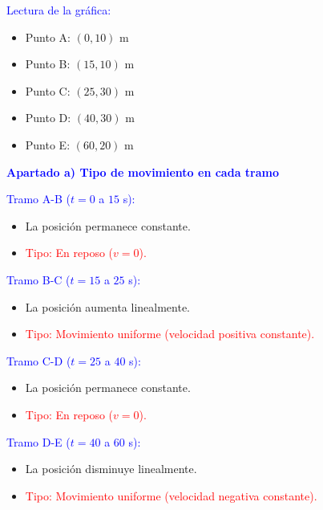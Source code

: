 \begin{exercise}
\begin{solu}
        \vspace{0.3cm}

        \textcolor{blue}{Lectura de la gráfica:}
        \begin{itemize}
            \item Punto A: $(0,10)$ m
            \item Punto B: $(15,10)$ m
            \item Punto C: $(25,30)$ m
            \item Punto D: $(40,30)$ m
            \item Punto E: $(60,20)$ m
        \end{itemize}

        \textbf{\textcolor{blue}{Apartado a) Tipo de movimiento en cada tramo}}

        \textcolor{blue}{Tramo A-B ($t=0$ a $15$ s):}
        \begin{itemize}
            \item La posición permanece constante.
            \item \textcolor{red}{Tipo: En reposo ($v=0$).}
        \end{itemize}

        \textcolor{blue}{Tramo B-C ($t=15$ a $25$ s):}
        \begin{itemize}
            \item La posición aumenta linealmente.
            \item \textcolor{red}{Tipo: Movimiento uniforme (velocidad positiva constante).}
        \end{itemize}

        \textcolor{blue}{Tramo C-D ($t=25$ a $40$ s):}
        \begin{itemize}
            \item La posición permanece constante.
            \item \textcolor{red}{Tipo: En reposo ($v=0$).}
        \end{itemize}

        \textcolor{blue}{Tramo D-E ($t=40$ a $60$ s):}
        \begin{itemize}
            \item La posición disminuye linealmente.
            \item \textcolor{red}{Tipo: Movimiento uniforme (velocidad negativa constante).}
        \end{itemize}

        \vspace{0.5cm}


\end{solu}
\end{exercise}
